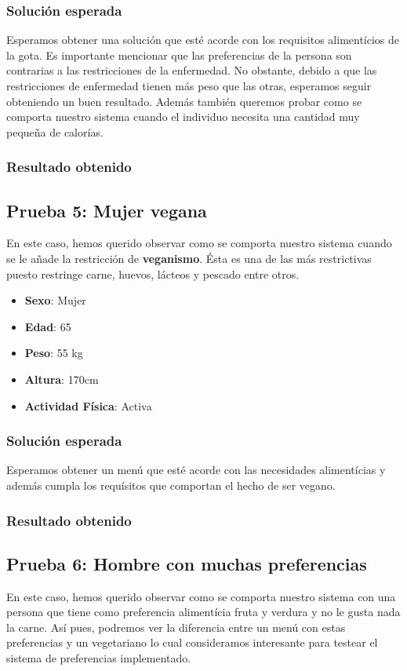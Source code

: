 \documentclass[12]{article}
\begin{document}
\subsubsection{Solución esperada}
Esperamos obtener una solución que esté acorde con los requisitos alimentícios de la gota. Es importante mencionar que las preferencias de la persona son contrarias a las restricciones de la enfermedad. No obstante, debido a que las restricciones de enfermedad tienen más peso que las otras, esperamos seguir obteniendo un buen resultado. Además también queremos probar como se comporta nuestro sistema cuando el individuo necesita una cantidad muy pequeña de calorías. 

\subsubsection{Resultado obtenido}


\subsection{Prueba 5: Mujer vegana}
En este caso, hemos querido observar como se comporta nuestro sistema cuando se le añade la restricción de \textbf{veganismo}. Ésta es una de las más restrictivas puesto restringe carne, huevos, lácteos y pescado entre otros. 

\begin{itemize}
\item \textbf{Sexo}: Mujer
\item \textbf{Edad}: 65
\item \textbf{Peso}: 55 kg
\item \textbf{Altura}: 170cm
\item \textbf{Actividad Física}: Activa
\end{itemize}

\subsubsection{Solución esperada}
Esperamos obtener un menú que esté acorde con las necesidades alimentícias y además cumpla los requísitos que comportan el hecho de ser vegano.

\subsubsection{Resultado obtenido}

\subsection{Prueba 6: Hombre con muchas preferencias}
En este caso, hemos querido observar como se comporta nuestro sistema con una persona que tiene como preferencia alimentícia fruta y verdura y no le gusta nada la carne. Así pues, podremos ver la diferencia entre un menú con estas preferencias y un vegetariano lo cual consideramos interesante para testear el sistema de preferencias implementado. 
\end{document}
